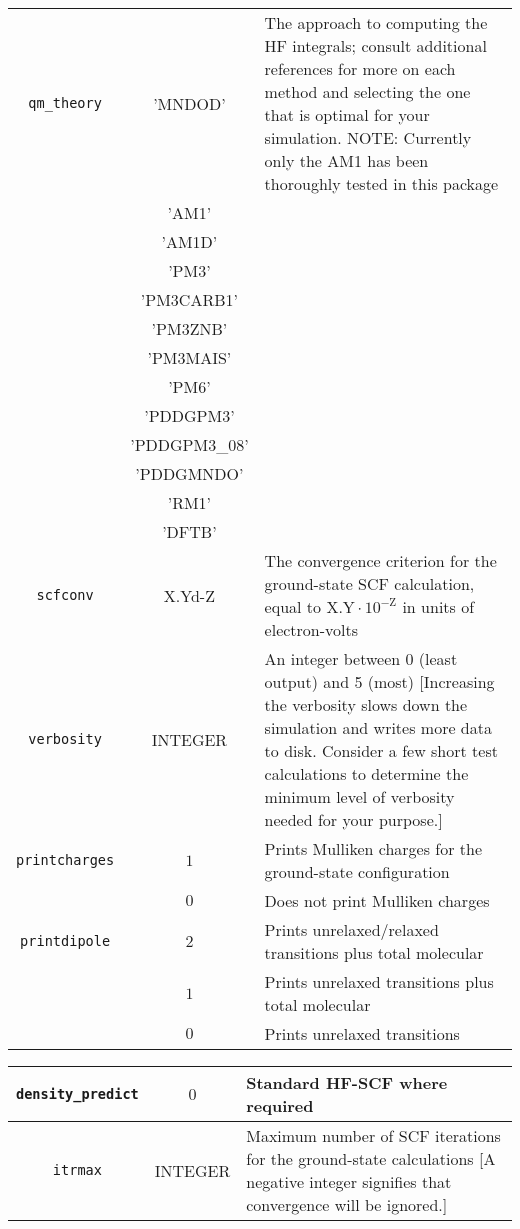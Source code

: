 \documentclass[12pt,letter,footinclude=true,headinclude=true,hyphens,oneside]{book} %
\begin{document}
    \begin{tabular}{ | c | c | p{7cm} | }
    \hline
    \texttt{qm\_theory} & 'MNDOD' & The approach to computing the HF integrals; consult additional references for more on each method and selecting the one that is optimal for your simulation. NOTE: Currently only the AM1 has been thoroughly tested in this package\\
    & 'AM1' & \\
    & 'AM1D' & \\
    & 'PM3' & \\
    & 'PM3CARB1' & \\
    & 'PM3ZNB' & \\
    & 'PM3MAIS' & \\
    & 'PM6' & \\
    & 'PDDGPM3' & \\
    & 'PDDGPM3\_08' & \\
    & 'PDDGMNDO' & \\
    & 'RM1' & \\
    & 'DFTB' & \\
    \hline
    \texttt{scfconv} & X.Yd-Z & The convergence criterion for the ground-state SCF calculation, equal to $\mathrm{X.Y} \cdot 10^{-\mathrm{Z}}$ in units of electron-volts \\
    \hline
    \texttt{verbosity} & INTEGER & An integer between 0 (least output) and 5 (most) [Increasing the verbosity slows down the simulation and writes more data to disk. Consider a few short test calculations to determine the minimum level of verbosity needed for your purpose.]\\
    \hline
    \texttt{printcharges} & $1$ & Prints Mulliken charges for the ground-state configuration \\
    & $0$ & Does not print Mulliken charges \\
    \hline
    \texttt{printdipole} & $2$ & Prints unrelaxed/relaxed transitions plus total molecular \\
    & $1$ & Prints unrelaxed transitions plus total molecular \\
    & $0$ & Prints unrelaxed transitions \\ \hline
    \end{tabular}
    
    \begin{tabular}{ | c | c | p{7cm} | }
    \hline
    \texttt{density\_predict} & $0$ & Standard HF-SCF where required \\ \hline
    \texttt{itrmax} & INTEGER & Maximum number of SCF iterations for the ground-state calculations [A negative integer signifies that convergence will be ignored.]\\
    \hline
    \end{tabular}
    
\end{document}
